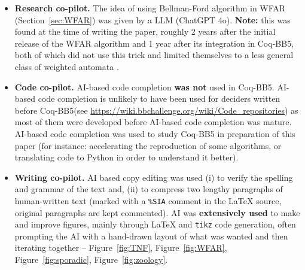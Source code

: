 \documentclass[a4paper,british]{article}
\theoremstyle{definition} %
\numberwithin{equation}{section}
\theoremstyle{definition} %
\newcommand{\CoqBB}{Coq-BB5\xspace}
\begin{document}
\begin{itemize}
    \item \textbf{Research co-pilot.} The idea of using Bellman-Ford algorithm in WFAR (Section~\ref{sec:WFAR}) was given by a LLM (ChatGPT 4o). \textbf{Note:} this was found at the time of writing the paper, roughly 2 years after the initial release of the WFAR algorithm and 1 year after its integration in \CoqBB, both of which did not use this trick and limited themselves to a less general class of weighted automata \cite{iijil1_2025_14914502}.
    \item \textbf{Code co-pilot.} AI-based code completion \textbf{was not} used in \CoqBB. AI-based code completion is unlikely to have been used for deciders written before \CoqBB (see \url{https://wiki.bbchallenge.org/wiki/Code_repositories}) as most of them were developed before AI-based code completion was mature. AI-based code completion was used to study \CoqBB in preparation of this paper (for instance: accelerating the reproduction of some algorithms, or translating \Coq code to Python in order to understand it better).
    \item \textbf{Writing co-pilot.} AI based copy editing was used (i) to verify the spelling and grammar of the text and, (ii) to compress two lengthy paragraphs of human-written text (marked with a \texttt{\%SIA} comment in the LaTeX source, original paragraphs are kept commented). AI was \textbf{extensively used} to make and improve figures, mainly through LaTeX and \texttt{tikz} code generation, often prompting the AI with a hand-drawn layout of what was wanted and then iterating together -- \eg Figure~\ref{fig:TNF}, Figure~\ref{fig:WFAR}, Figure~\ref{fig:sporadic}, Figure~\ref{fig:zoology}.

\end{itemize}
\end{document}
